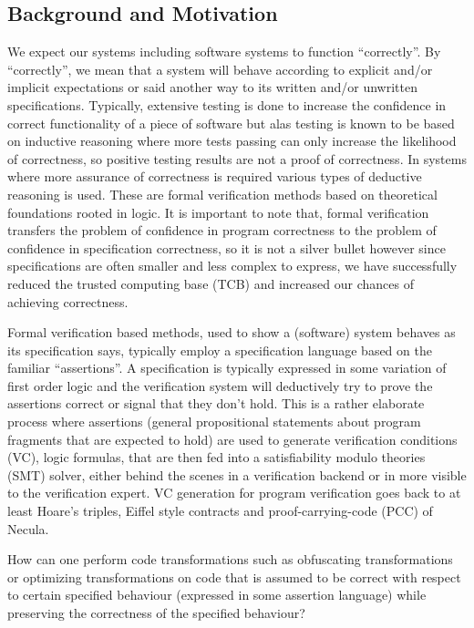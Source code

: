 \documentclass[compsoc,conference,a4paper,10pt,times]{IEEEtran}
\begin{document}
\subsection{Background and Motivation}
We expect our systems including software systems to function ``correctly''. By ``correctly'', we mean that a system will behave according to explicit and/or implicit expectations or said another way to its written and/or unwritten specifications. Typically, extensive testing is done to increase the confidence in correct functionality of a piece of software but alas testing is known to be based on inductive reasoning where more tests passing can only increase the likelihood of correctness, so positive testing results are not a proof of correctness. In systems where more assurance of correctness is required various types of deductive reasoning is used. These are formal verification methods based on theoretical foundations rooted in logic. It is important to note that, formal verification transfers the problem of confidence in program correctness to the problem of confidence in specification correctness, so it is not a silver bullet however since specifications are often smaller and less complex to express, we have successfully reduced the trusted computing base (TCB) and increased our chances of achieving correctness.

Formal verification based methods, used to show a (software) system behaves as its specification says, typically employ a specification language based on the familiar ``assertions''. A specification is typically expressed in some variation of first order logic and the verification system will deductively try to prove the assertions correct or signal that they don't hold. This is a rather elaborate process where assertions (general propositional statements about program fragments that are expected to hold) are used to generate verification conditions (VC), logic formulas, that are then fed into a satisfiability modulo theories (SMT) solver, either behind the scenes in a verification backend or in more visible to the verification expert. VC generation for program verification goes back to at least Hoare's triples, Eiffel style contracts and proof-carrying-code (PCC) of Necula\cite{b7}.

How can one perform code transformations such as obfuscating transformations or optimizing transformations on code that is assumed to be correct with respect to certain specified behaviour (expressed in some assertion language) while preserving the correctness of the specified behaviour? 
\end{document}
